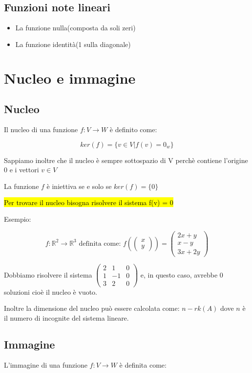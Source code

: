 \documentclass[a4paper, 10pt]{article}
\begin{document}
\subsection{Funzioni note lineari}

\begin{itemize}
	\item La funzione nulla(composta da soli zeri)
	\item La funzione identità(1 sulla diagonale)
\end{itemize}

\section{Nucleo e immagine}

\subsection{Nucleo}
Il nucleo di una funzione $f: V \rightarrow W$ è definito come: 

$$ker(f) = \{v \in V | f(v) = 0_w\}$$

Sappiamo inoltre che il nucleo è sempre sottospazio di V perchè contiene l'origine 0 e i vettori $v \in V$

La funzione $f$ è iniettiva se e solo se $ker(f) = \{0\}$

\hl{Per trovare il nucleo bisogna risolvere il sistema f(v) = 0}

Esempio:

$$ f: \mathbb{R}^2 \rightarrow \mathbb{R}^3 \text{ definita come: } f(\begin{pmatrix}
	x \\
	y 
\end{pmatrix}) = \begin{pmatrix}
2x+y \\
x-y \\
3x+2y 
\end{pmatrix}  $$

Dobbiamo risolvere il sistema $\begin{pmatrix}
	2 & 1 & 0 \\
	1 & -1 & 0 \\
	3 & 2 & 0 
\end{pmatrix}$ e, in questo caso, avrebbe 0 soluzioni cioè il nucleo è vuoto.

Inoltre la dimensione del nucleo può essere calcolata come: $n-rk(A)$ dove $n$ è il numero di incognite del sistema lineare.

\subsection{Immagine}
L'immagine di una funzione $f: V \rightarrow W$ è definita come:
\end{document}
